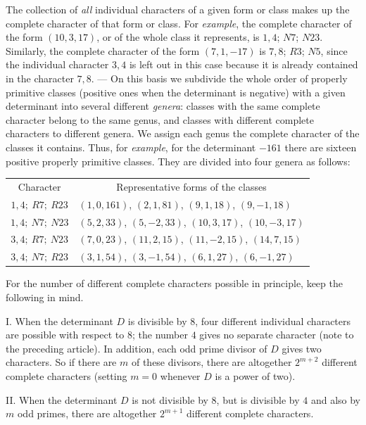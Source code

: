 The collection of \textit{all} individual characters of a given form or class makes up the complete character of that form or class. For \textit{example}, the complete character of the form $(10,3,17)$, or of the whole class it represents, is $1,4$; $N7$; $N23$. Similarly, the complete character of the form $(7,1,-17)$ is $7,8$; $R3$; $N5$, since the individual character $3,4$ is left out in this case because it is already contained in the character $7,8$. --- On this basis we subdivide the whole order of properly primitive classes (positive ones when the determinant is negative) with a given determinant into several different \textit{genera}: classes with the same complete character belong to the same genus, and classes with different complete characters to different genera. We assign each genus the complete character of the classes it contains. Thus, for \textit{example}, for the determinant $-161$ there are sixteen
positive properly primitive classes. They are divided into four genera as follows:
\begin{center}
\begin{tabular}{c|l}
Character & \multicolumn{1}{c}{Representative forms of the classes} \\
$1,4;\ R7;\ R23$ & $(1,0,161)$, $(2,1,81)$, $(9,1,18)$, $(9,-1,18)$ \\
$1,4;\ N7;\ N23$ & $(5,2,33)$, $(5,-2,33)$, $(10,3,17)$, $(10,-3,17)$ \\
$3,4;\ R7;\ N23$ & $(7,0,23)$, $(11,2,15)$, $(11,-2,15)$, $(14,7,15)$ \\
$3,4;\ N7;\ R23$ & $(3,1,54)$, $(3,-1,54)$, $(6,1,27)$, $(6,-1,27)$
\end{tabular}
\end{center}

For the number of different complete characters possible in principle, keep the following in mind.

I. When the determinant $D$ is divisible by $8$, four different individual characters are possible with respect to $8$; the number $4$ gives no separate character (note to the preceding article). In addition, each odd prime divisor of $D$ gives two characters. So if there are $m$ of these divisors, there are altogether $2^{m+2}$ different complete characters (setting $m=0$ whenever $D$ is a power of two).

II. When the determinant $D$ is not divisible by $8$, but is divisible by $4$ and also by $m$ odd primes, there are altogether $2^{m+1}$ different complete characters.

